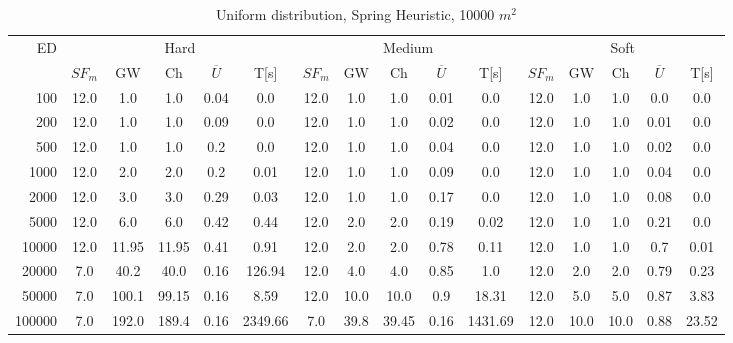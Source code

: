 \begin{table}[htb]
	\centering
	\begin{tabular}{|r|c|c|c|c|c|c|c|c|c|c|c|c|c|c|c|} 
		\multirow{2}{*}{ED} & \multicolumn{5}{c|}{Hard} & \multicolumn{5}{c|}{Medium} &\multicolumn{5}{c|}{Soft} \\ 
		\cline{2-16} 
		&$SF_{m}$&GW & Ch & $\overline{U}$&T[s] &$SF_{m}$&GW & Ch & $\overline{U}$ &T[s] &$SF_{m}$&GW & Ch & $\overline{U}$  & T[s]  \\ 
		\hline 
		100 & 12.0 & 1.0 & 1.0 & 0.04 & 0.0 & 12.0 & 1.0 & 1.0 & 0.01 & 0.0 & 12.0 & 1.0 & 1.0 & 0.0 & 0.0\\ 
		200 & 12.0 & 1.0 & 1.0 & 0.09 & 0.0 & 12.0 & 1.0 & 1.0 & 0.02 & 0.0 & 12.0 & 1.0 & 1.0 & 0.01 & 0.0\\ 
		500 & 12.0 & 1.0 & 1.0 & 0.2 & 0.0 & 12.0 & 1.0 & 1.0 & 0.04 & 0.0 & 12.0 & 1.0 & 1.0 & 0.02 & 0.0\\ 
		1000 & 12.0 & 2.0 & 2.0 & 0.2 & 0.01 & 12.0 & 1.0 & 1.0 & 0.09 & 0.0 & 12.0 & 1.0 & 1.0 & 0.04 & 0.0\\ 
		2000 & 12.0 & 3.0 & 3.0 & 0.29 & 0.03 & 12.0 & 1.0 & 1.0 & 0.17 & 0.0 & 12.0 & 1.0 & 1.0 & 0.08 & 0.0\\ 
		5000 & 12.0 & 6.0 & 6.0 & 0.42 & 0.44 & 12.0 & 2.0 & 2.0 & 0.19 & 0.02 & 12.0 & 1.0 & 1.0 & 0.21 & 0.0\\ 
		10000 & 12.0 & 11.95 & 11.95 & 0.41 & 0.91 & 12.0 & 2.0 & 2.0 & 0.78 & 0.11 & 12.0 & 1.0 & 1.0 & 0.7 & 0.01\\ 
		20000 & 7.0 & 40.2 & 40.0 & 0.16 & 126.94 & 12.0 & 4.0 & 4.0 & 0.85 & 1.0 & 12.0 & 2.0 & 2.0 & 0.79 & 0.23\\ 
		50000 & 7.0 & 100.1 & 99.15 & 0.16 & 8.59 & 12.0 & 10.0 & 10.0 & 0.9 & 18.31 & 12.0 & 5.0 & 5.0 & 0.87 & 3.83\\ 
		100000 & 7.0 & 192.0 & 189.4 & 0.16 & 2349.66 & 7.0 & 39.8 & 39.45 & 0.16 & 1431.69 & 12.0 & 10.0 & 10.0 & 0.88 & 23.52\\ 
		\hline 
	\end{tabular} 
	\caption{Uniform distribution, Spring Heuristic, 10000 $m^2$} 
	\label{tab:UnRandom100} 
\end{table} 
